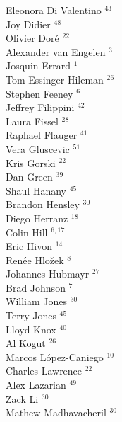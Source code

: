 \documentclass[PICOReport.tex]{subfiles}
\begin{document}
{\begin{multicols}{4}
Eleonora Di Valentino $^{43}$           \\
Joy Didier $^{48}$                      \\
Olivier Dor\'e $^{22}$                  \\
Alexander van Engelen $^{3}$           \\
Josquin Errard $^{1}$                  \\
Tom Essinger-Hileman $^{26}$            \\
Stephen Feeney $^{6}$                  \\
Jeffrey Filippini $^{42}$               \\
Laura Fissel $^{28}$                    \\
Raphael Flauger $^{41}$                 \\
Vera Gluscevic $^{51}$                  \\
Kris Gorski $^{22}$                     \\
Dan Green $^{39}$                       \\
Shaul Hanany $^{45}$                    \\
Brandon Hensley $^{30}$                 \\
Diego Herranz $^{18}$                   \\
Colin Hill $^{6,17}$                      \\
Eric Hivon $^{14}$                      \\
Ren\'{e}e  Hlo\v{z}ek $^{8}$           \\
Johannes Hubmayr $^{27}$                \\
Brad Johnson $^{7}$                    \\
William Jones $^{30}$                   \\
Terry Jones $^{45}$                     \\
Lloyd Knox $^{40}$                      \\
Al Kogut $^{26}$                        \\
Marcos L\'{o}pez-Caniego $^{10}$        \\
Charles Lawrence $^{22}$                \\
Alex Lazarian $^{49}$                   \\
Zack Li $^{30}$                         \\
Mathew Madhavacheril $^{30}$            \\

\end{multicols}}
\end{document}
